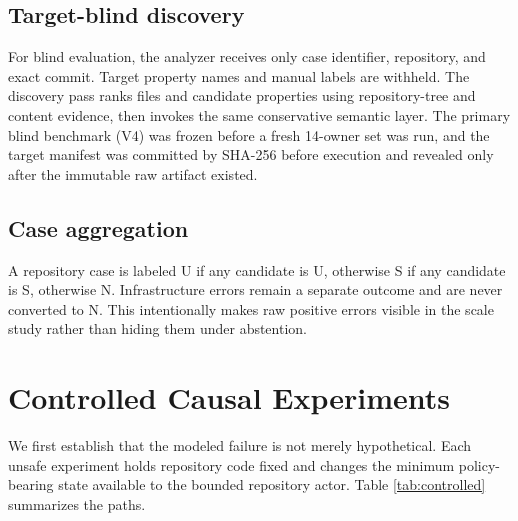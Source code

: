 \documentclass[sigconf,review,anonymous]{acmart}
\newcommand{\U}{\textsf{U}}
\newcommand{\Ssafe}{\textsf{S}}
\newcommand{\N}{\textsf{N}}
\begin{document}
\subsection{Target-blind discovery}

For blind evaluation, the analyzer receives only case identifier, repository,
and exact commit.  Target property names and manual labels are withheld.  The
discovery pass ranks files and candidate properties using repository-tree and
content evidence, then invokes the same conservative semantic layer.  The
primary blind benchmark (V4) was frozen before a fresh 14-owner set was run, and
the target manifest was committed by SHA-256 before execution and revealed only
after the immutable raw artifact existed.

\subsection{Case aggregation}

A repository case is labeled \U{} if any candidate is \U{}, otherwise \Ssafe{}
if any candidate is \Ssafe{}, otherwise \N{}.  Infrastructure errors remain a
separate outcome and are never converted to \N{}.  This intentionally makes raw
positive errors visible in the scale study rather than hiding them under
abstention.

\section{Controlled Causal Experiments}
\label{sec:controlled}

We first establish that the modeled failure is not merely hypothetical.  Each
unsafe experiment holds repository code fixed and changes the minimum
policy-bearing state available to the bounded repository actor.  Table
\ref{tab:controlled} summarizes the paths.
\end{document}

